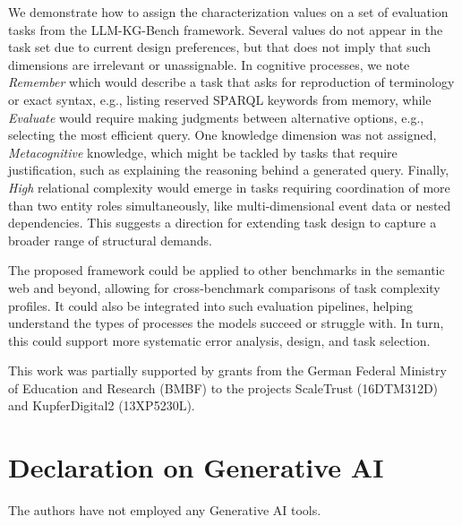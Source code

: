 \documentclass[
]{ceurart}
\newcommand{\LKGBf}{LLM-KG-Bench framework\xspace} %
\begin{document}
We demonstrate how to assign the characterization values on a set of evaluation tasks from the \LKGBf. Several values do not appear in the task set due to current design preferences, but that does not imply that such dimensions are irrelevant or unassignable. In cognitive processes, we note \emph{Remember} which would describe a task that asks for reproduction of terminology or exact syntax, e.g., listing reserved SPARQL keywords from memory, while \emph{Evaluate} would require making judgments between alternative options, e.g., selecting the most efficient query. One knowledge dimension was not assigned, \emph{Metacognitive} knowledge, which might be tackled by tasks that require justification, such as explaining the reasoning behind a generated query. Finally, \emph{High} relational complexity would emerge in tasks requiring coordination of more than two entity roles simultaneously, like multi-dimensional event data or nested dependencies. This suggests a direction for extending task design to capture a broader range of structural demands.

The proposed framework could be applied to other benchmarks in the semantic web and beyond, allowing for cross-benchmark comparisons of task complexity profiles. It could also be integrated into such evaluation pipelines, helping understand the types of processes the models succeed or struggle with. In turn, this could support more systematic error analysis, design, and task selection.




\begin{acknowledgments}
This work was partially supported by grants from the German Federal Ministry of Education and Research (BMBF) to the projects ScaleTrust (16DTM312D) and KupferDigital2 (13XP5230L).
\end{acknowledgments}


\section*{Declaration on Generative AI}
The authors have not employed any Generative AI tools.


\end{document}
